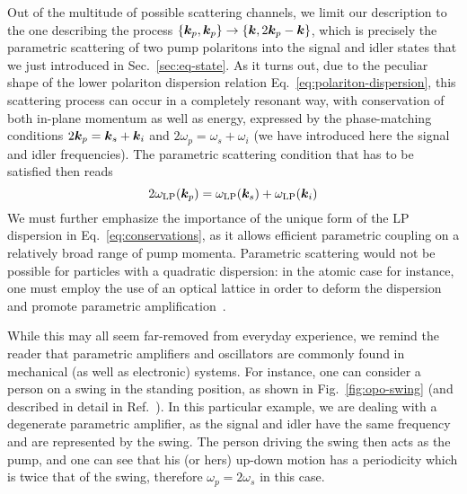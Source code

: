 Out of the multitude of possible scattering channels, we limit our
description to the one describing the process
$\{\bm{k}_p, \bm{k}_p\} \rightarrow \{\bm{k}, 2\bm{k}_p - \bm{k}\}$, which is
precisely the parametric scattering of two pump polaritons into the
signal and idler states that we just introduced in
Sec.~\ref{sec:eq-state}. As it turns out, due to the peculiar shape
of the lower polariton dispersion relation
Eq.~\eqref{eq:polariton-dispersion}, this scattering process can occur
in a completely resonant way, with conservation of both in-plane
momentum as well as energy, expressed by the phase-matching conditions
$2\bm{k}_p = \bm{k}_s + \bm{k}_i$ and $2\omega_p = \omega_s + \omega_i$ (we
have introduced here the signal and idler frequencies). The parametric
scattering condition that has to be satisfied then reads
%
\begin{equation}\label{eq:conservations}
  2\omega_{\text{LP}}(\bm{k}_p) =   \omega_{\text{LP}}(\bm{k}_s) +   \omega_{\text{LP}}(\bm{k}_i)
\end{equation}
% 
We must further emphasize the importance of the unique form of the LP
dispersion in Eq.~\eqref{eq:conservations}, as it allows efficient
parametric coupling on a relatively broad range of pump momenta.
Parametric scattering would not be possible for particles with a
quadratic dispersion: in the atomic case for instance, one must employ
the use of an optical lattice in order to deform the dispersion and
promote parametric amplification~\cite{Campbell2006}. 

While this may all seem far-removed from everyday experience, we
remind the reader that parametric amplifiers and oscillators are
commonly found in mechanical (as well as electronic) systems. For
instance, one can consider a person on a swing in the standing
position, as shown in Fig.~\ref{fig:opo-swing} (and described in
detail in Ref.~\cite{case1996pumping}). In this particular example, we
are dealing with a degenerate parametric amplifier, as the signal and
idler have the same frequency and are represented by the swing. The
person driving the swing then acts as the pump, and one can see that
his (or hers) up-down motion has a periodicity which is twice that of
the swing, therefore $\omega_p = 2\omega_s$ in this case.

